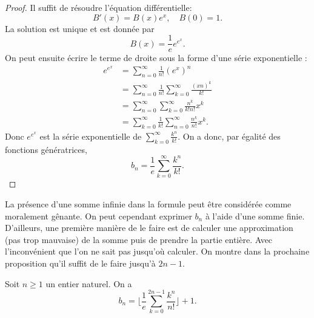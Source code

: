 \documentclass[../main.tex]{subfiles}
\begin{document}
\begin{proof}
    Il suffit de résoudre l'équation différentielle:
    \begin{equation}
        B'(x) = B(x)e^x, \quad B(0) = 1.
    \end{equation}
    La solution est unique et est donnée par
    \begin{equation}
        B(x) = \frac{1}{e}e^{e^x}.
    \end{equation}
    On peut ensuite écrire le terme de droite sous la forme d'une série exponentielle :
    \begin{align}
        e^{e^x} &= \sum_{n=0}^{\infty}\frac{1}{n!}(e^x)^n\\
        &= \sum_{n=0}^\infty \frac{1}{n!} \sum_{k=0}^\infty \frac{(xn)^k}{k!}\\
        & = \sum_{n=0}^\infty \sum_{k=0}^\infty \frac{n^k}{k!n!}x^k\\
        &= \sum_{k=0}^\infty \frac{1}{k!}\sum_{n=0}^\infty \frac{n^k}{n!}x^k.
        \end{align}
    Donc \(e^{e^x}\) est la série exponentielle de \(\sum_{k=0}^\infty \frac{k^n}{k!}\).
    On a donc, par égalité des fonctions génératrices,
    \begin{equation}
        b_n = \frac{1}{e}\sum_{k=0}^{\infty}\frac{k^n}{k!}.
    \end{equation}
\end{proof}
La présence d'une somme infinie dans la formule peut être considérée comme moralement gênante.
On peut cependant exprimer \(b_n\) à l'aide d'une somme finie. D'ailleurs, une première
manière de le faire est de calculer une approximation (pas trop mauvaise) de la somme puis de
prendre la partie entière. Avec l'inconvénient que l'on ne sait pas jusqu'où calculer.
On montre dans la prochaine proposition qu'il suffit de le faire jusqu'à \(2n-1\).
\begin{proposition} Soit \(n\ge 1\) un entier naturel. On a 
    \begin{equation}
        b_n = \lfloor\frac{1}{e}\sum_{k=0}^{2n-1}\frac{k^n}{n!}\rfloor + 1.
    \end{equation}
\end{proposition}
\end{document}
